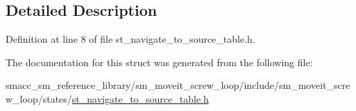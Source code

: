 \subsection{Detailed Description}


Definition at line 8 of file st\+\_\+navigate\+\_\+to\+\_\+source\+\_\+table.\+h.



The documentation for this struct was generated from the following file\+:\begin{DoxyCompactItemize}
\item 
smacc\+\_\+sm\+\_\+reference\+\_\+library/sm\+\_\+moveit\+\_\+screw\+\_\+loop/include/sm\+\_\+moveit\+\_\+screw\+\_\+loop/states/\hyperlink{sm__moveit__screw__loop_2include_2sm__moveit__screw__loop_2states_2st__navigate__to__source__table_8h}{st\+\_\+navigate\+\_\+to\+\_\+source\+\_\+table.\+h}\end{DoxyCompactItemize}
